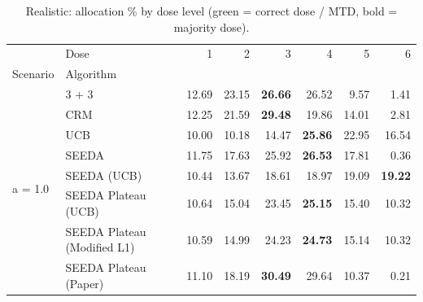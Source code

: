 \begin{table}[H]
\centering
\caption{Realistic: allocation \% by dose level (green = correct dose / MTD, bold = majority dose).}
\label{tab:real_alloc_by_dose}
\begin{tabular}{llrrrrrr}
\toprule
 & Dose & 1 & 2 & 3 & 4 & 5 & 6 \\
Scenario & Algorithm &  &  &  &  &  &  \\
\midrule
\multirow[c]{8}{*}{a = 1.0} & 3 + 3 & 12.69 & 23.15 & {\cellcolor[HTML]{C8E6C9}} \bfseries 26.66 & 26.52 & 9.57 & 1.41 \\
 & CRM & 12.25 & 21.59 & {\cellcolor[HTML]{C8E6C9}} \bfseries 29.48 & 19.86 & 14.01 & 2.81 \\
 & UCB & 10.00 & 10.18 & {\cellcolor[HTML]{C8E6C9}} 14.47 & \bfseries 25.86 & 22.95 & 16.54 \\
 & SEEDA & 11.75 & 17.63 & {\cellcolor[HTML]{C8E6C9}} 25.92 & \bfseries 26.53 & 17.81 & 0.36 \\
 & SEEDA (UCB) & 10.44 & 13.67 & {\cellcolor[HTML]{C8E6C9}} 18.61 & 18.97 & 19.09 & \bfseries 19.22 \\
 & SEEDA Plateau (UCB) & 10.64 & 15.04 & {\cellcolor[HTML]{C8E6C9}} 23.45 & \bfseries 25.15 & 15.40 & 10.32 \\
 & SEEDA Plateau (Modified L1) & 10.59 & 14.99 & {\cellcolor[HTML]{C8E6C9}} 24.23 & \bfseries 24.73 & 15.14 & 10.32 \\
 & SEEDA Plateau (Paper) & 11.10 & 18.19 & {\cellcolor[HTML]{C8E6C9}} \bfseries 30.49 & 29.64 & 10.37 & 0.21 \\
\bottomrule
\end{tabular}
\end{table}
